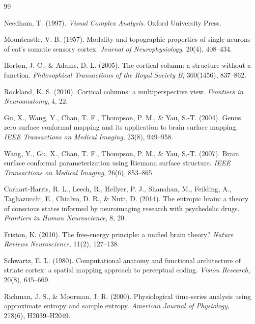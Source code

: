 \documentclass[11pt]{article}
\begin{document}
\begin{thebibliography}{99}

Needham, T. (1997). \emph{Visual Complex Analysis}. Oxford University Press.

Mountcastle, V. B. (1957). Modality and topographic properties of single neurons of cat's somatic sensory cortex. \emph{Journal of Neurophysiology}, 20(4), 408--434.

Horton, J. C., \& Adams, D. L. (2005). The cortical column: a structure without a function. \emph{Philosophical Transactions of the Royal Society B}, 360(1456), 837--862.

Rockland, K. S. (2010). Cortical columns: a multiperspective view. \emph{Frontiers in Neuroanatomy}, 4, 22.

Gu, X., Wang, Y., Chan, T. F., Thompson, P. M., \& Yau, S.-T. (2004).
Genus zero surface conformal mapping and its application to brain surface mapping.
\emph{IEEE Transactions on Medical Imaging}, 23(8), 949--958.

Wang, Y., Gu, X., Chan, T. F., Thompson, P. M., \& Yau, S.-T. (2007).
Brain surface conformal parameterization using Riemann surface structure.
\emph{IEEE Transactions on Medical Imaging}, 26(6), 853--865.

Carhart-Harris, R. L., Leech, R., Hellyer, P. J., Shanahan, M., Feilding, A., Tagliazucchi, E., Chialvo, D. R., \& Nutt, D. (2014).
The entropic brain: a theory of conscious states informed by neuroimaging research with psychedelic drugs.
\emph{Frontiers in Human Neuroscience}, 8, 20.

Friston, K. (2010). The free-energy principle: a unified brain theory? \emph{Nature Reviews Neuroscience}, 11(2), 127--138.

Schwartz, E. L. (1980). Computational anatomy and functional architecture of striate cortex: a spatial mapping approach to perceptual coding. \emph{Vision Research}, 20(8), 645--669.

Richman, J. S., \& Moorman, J. R. (2000). Physiological time-series analysis using approximate entropy and sample entropy. \emph{American Journal of Physiology}, 278(6), H2039--H2049.


\end{thebibliography}
\end{document}

